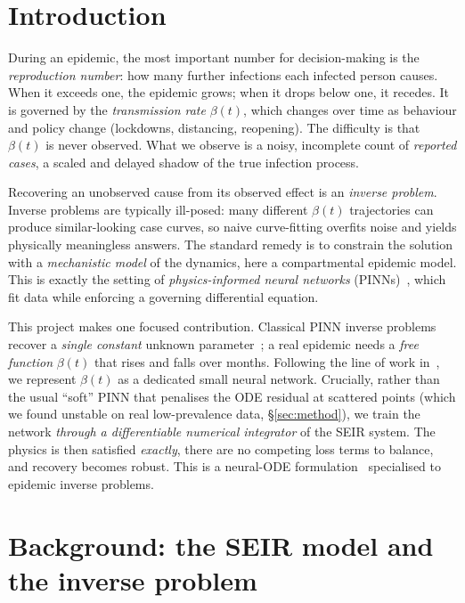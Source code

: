\documentclass[10pt,twocolumn]{article}
\begin{document}
\section{Introduction}
During an epidemic, the most important number for decision-making is the
\emph{reproduction number}: how many further infections each infected person
causes. When it exceeds one, the epidemic grows; when it drops below one, it
recedes. It is governed by the \emph{transmission rate} $\beta(t)$, which changes
over time as behaviour and policy change (lockdowns, distancing, reopening). The
difficulty is that $\beta(t)$ is never observed. What we observe is a noisy,
incomplete count of \emph{reported cases}, a scaled and delayed shadow of the true
infection process.

Recovering an unobserved cause from its observed effect is an \emph{inverse
problem}. Inverse problems are typically ill-posed: many different $\beta(t)$
trajectories can produce similar-looking case curves, so naive curve-fitting
overfits noise and yields physically meaningless answers. The standard remedy is
to constrain the solution with a \emph{mechanistic model} of the dynamics, here
a compartmental epidemic model. This is exactly the setting of
\emph{physics-informed neural networks} (PINNs)~\cite{raissi2019}, which fit data
while enforcing a governing differential equation.

This project makes one focused contribution. Classical PINN inverse problems
recover a \emph{single constant} unknown parameter~\cite{shaier2021}; a real
epidemic needs a \emph{free function} $\beta(t)$ that rises and falls over months.
Following the line of work in~\cite{kharazmi2021,millevoi2023,long2021}, we
represent $\beta(t)$ as a dedicated small neural network. Crucially, rather than
the usual ``soft'' PINN that penalises the ODE residual at scattered points (which
we found unstable on real low-prevalence data, \S\ref{sec:method}), we train the
network \emph{through a differentiable numerical integrator} of the SEIR system.
The physics is then satisfied \emph{exactly}, there are no competing loss terms to
balance, and recovery becomes robust. This is a neural-ODE
formulation~\cite{chen2018} specialised to epidemic inverse problems.

\section{Background: the SEIR model and the inverse problem}
\end{document}

